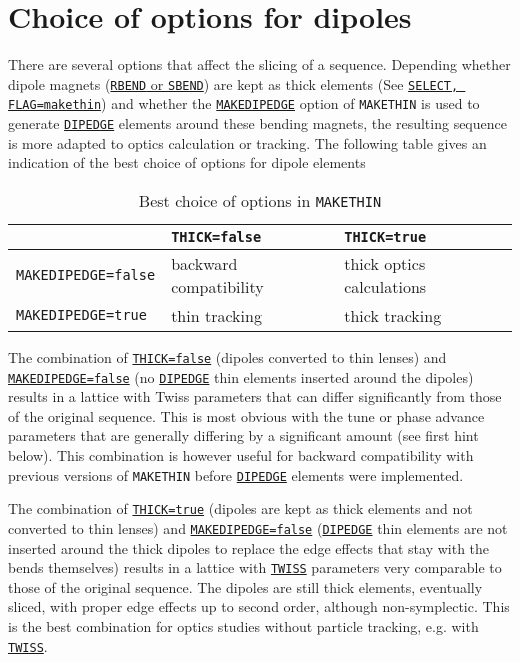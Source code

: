 \section{Choice of options for dipoles}

There are several options that affect the slicing of a sequence. 
Depending whether dipole magnets (\hyperref[sec:bend]{{\tt RBEND} 
or {\tt SBEND}}) are kept as thick elements 
(See \hyperref[sec:select]{\tt SELECT, FLAG=makethin}) and 
whether the \hyperref[sec:makethin]{\tt MAKEDIPEDGE} option 
of {\tt MAKETHIN} is used to generate 
\hyperref[sec:dipedge]{\tt DIPEDGE} elements around these bending magnets, 
the resulting sequence is more adapted to optics calculation or tracking. 
The following table gives an indication of the best choice of options for 
dipole elements 

\begin{table}[ht]
\caption{Best choice of options in {\tt MAKETHIN}}
\vspace{1ex}
\begin{center}
	\begin{tabular}{|l|l|l|}
	\hline
	   & {\tt THICK=false} & {\tt THICK=true}\\
	\hline
	{\tt MAKEDIPEDGE=false} & backward compatibility & thick optics calculations \\
	\hline
	{\tt MAKEDIPEDGE=true} & thin tracking & thick tracking \\
	\hline
	\end{tabular}
	\end{center}
\end{table}

The combination of \hyperref[sec:numberofslices]{\tt THICK=false} 
(dipoles converted to thin lenses) 
and \hyperref[sec:makethin]{\tt MAKEDIPEDGE=false} 
(no \hyperref[sec:dipedge]{\tt DIPEDGE} 
thin elements inserted around the dipoles) results in a lattice with 
Twiss parameters that can differ significantly from those of 
the original sequence. 
This is most obvious with the tune or phase advance parameters 
that are generally differing by a significant amount (see first 
hint below). This combination is however useful for backward compatibility 
with previous versions of {\tt MAKETHIN} before 
\hyperref[sec:dipedge]{\tt DIPEDGE} elements were
implemented. 

The combination of \hyperref[sec:numberofslices]{\tt THICK=true} 
(dipoles are kept as thick elements and not converted to thin lenses) 
and \hyperref[sec:makethin]{\tt MAKEDIPEDGE=false} 
(\hyperref[sec:dipedge]{\tt DIPEDGE} thin elements 
are not inserted around the thick dipoles to replace the edge effects 
that stay with the bends themselves) 
results in a lattice with \hyperref[chap:twiss]{\tt TWISS} parameters 
very comparable to those of the original sequence. The dipoles are still 
thick elements, eventually sliced, with proper edge effects up to second 
order, although non-symplectic.
This is the best combination for optics studies without particle tracking, 
e.g. with \hyperref[chap:twiss]{\tt TWISS}. 

